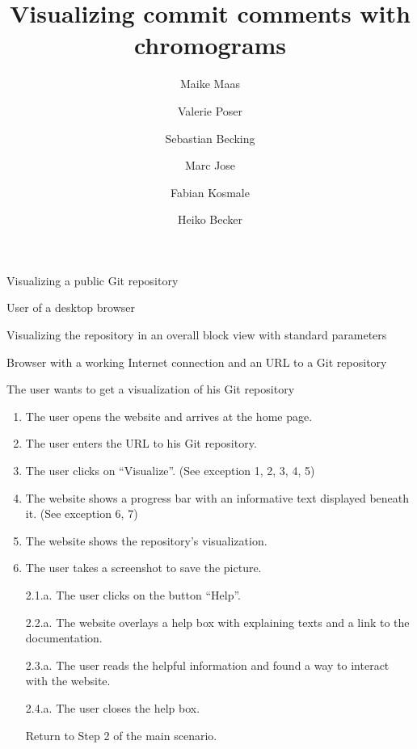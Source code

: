 \documentclass[11pt]{scrartcl}
\author{Maike Maas \and Valerie Poser \and Sebastian Becking \and
        Marc Jose \and Fabian Kosmale \and Heiko Becker}
\title{Visualizing commit comments with chromograms}
\begin{document}
\maketitle

\begin{description}[leftmargin=!,labelwidth=\widthof{\bfseries Frequency of use:}]
	\item[Use-case:] Visualizing a public Git repository 
	\item[Primary actor:] User of a desktop browser 
	\item[Goal in context:] Visualizing the repository in an overall block view with standard parameters 
	\item[Preconditions:] Browser with a working Internet connection and an URL to a Git repository
	\item[Trigger:] The user wants to get a visualization of his Git repository 

	\item[Scenario:]
		\begin{enumerate}[leftmargin=1.5em]
			\item The user opens the website and arrives at the home page.
			\item The user enters the URL to his Git repository. 
			\item The user clicks on \enquote{Visualize}. (See exception 1, 2, 3, 4, 5)
			\item The website shows a progress bar with an
				informative text displayed beneath
				it. (See exception 6, 7)
			\item The website shows the repository's visualization.
			\item The user takes a screenshot to save the picture. 
		\end{enumerate}
		
		
	\item[Alternate Flow]
		\begin{enumerate}
			\item[2.1.a.] The user clicks on the button \enquote{Help}.
			\item[2.2.a.] The website overlays a help box with explaining texts and a link to the documentation.
			\item[2.3.a.] The user reads the helpful information and found a way to interact with the website.
			\item[2.4.a.] The user closes the help box.
			\item[] Return to Step 2 of the main scenario.
		

\end{enumerate}
\end{description}
\end{document}
